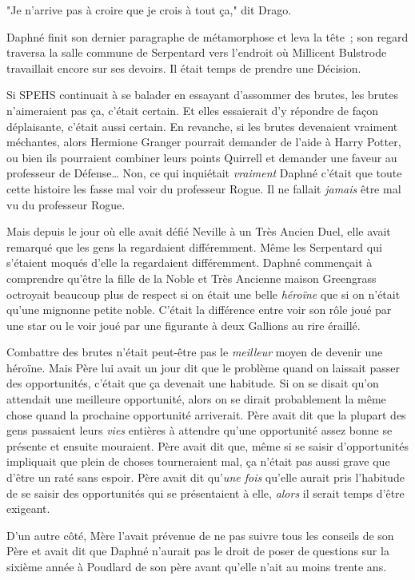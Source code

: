 "Je n'arrive pas à croire que je crois à tout ça," dit Drago.

\later

Daphné finit son dernier paragraphe de métamorphose et leva la tête~; son regard traversa la salle commune de Serpentard vers l'endroit où Millicent Bulstrode travaillait encore sur ses devoirs. Il était temps de prendre une Décision.

Si SPEHS continuait à se balader en essayant d'assommer des brutes, les brutes n'aimeraient pas ça, c'était certain. Et elles essaierait d'y répondre de façon déplaisante, c'était aussi certain. En revanche, si les brutes devenaient vraiment méchantes, alors Hermione Granger pourrait demander de l'aide à Harry Potter, ou bien ils pourraient combiner leurs points Quirrell et demander une faveur au professeur de Défense… Non, ce qui inquiétait \emph{vraiment} Daphné c'était que toute cette histoire les fasse mal voir du professeur Rogue. Il ne fallait \emph{jamais} être mal vu du professeur Rogue.

Mais depuis le jour où elle avait défié Neville à un Très Ancien Duel, elle avait remarqué que les gens la regardaient différemment. Même les Serpentard qui s'étaient moqués d'elle la regardaient différemment. Daphné commençait à comprendre qu'être la fille de la Noble et Très Ancienne maison Greengrass octroyait beaucoup plus de respect si on était une belle \emph{héroïne} que si on n'était qu'une mignonne petite noble. C'était la différence entre voir son rôle joué par une star ou le voir joué par une figurante à deux Gallions au rire éraillé.

Combattre des brutes n'était peut-être pas le \emph{meilleur} moyen de devenir une héroïne. Mais Père lui avait un jour dit que le problème quand on laissait passer des opportunités, c'était que ça devenait une habitude. Si on se disait qu'on attendait une meilleure opportunité, alors on se dirait probablement la même chose quand la prochaine opportunité arriverait. Père avait dit que la plupart des gens passaient leurs \emph{vies} entières à attendre qu'une opportunité assez bonne se présente et ensuite mouraient. Père avait dit que, même si se saisir d'opportunités impliquait que plein de choses tourneraient mal, ça n'était pas aussi grave que d'être un raté sans espoir. Père avait dit qu'\emph{une fois} qu'elle aurait pris l'habitude de se saisir des opportunités qui se présentaient à elle, \emph{alors} il serait temps d'être exigeant.

D'un autre côté, Mère l'avait prévenue de ne pas suivre tous les conseils de son Père et avait dit que Daphné n'aurait pas le droit de poser de questions sur la sixième année à Poudlard de son père avant qu'elle n'ait au moins trente ans.

